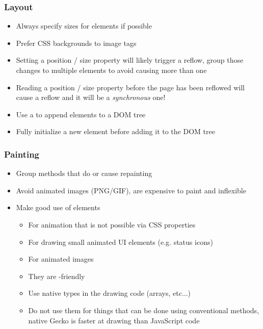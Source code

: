 \begin{frame}
 \frametitle{Layout}
 \begin{itemize}
  \item Always specify sizes for elements if possible
  \item Prefer CSS backgrounds to image tags
  \item Setting a position / size property will likely trigger a reflow, group
        those changes to multiple elements to avoid causing more than one
  \item Reading a position / size property before the page has been reflowed
        will cause a reflow and it will be a \emph{synchronous} one!
  \item Use a  to append elements to a DOM tree
  \item Fully initialize a new element before adding it to the DOM tree
 \end{itemize}
\end{frame}

\begin{frame}
 \frametitle{Painting}
 \begin{itemize}
  \item Group methods that do or cause repainting
  \item Avoid animated images (PNG/GIF), are expensive to paint and inflexible
  \item Make good use of  elements
  \begin{itemize}
   \item For animation that is not possible via CSS properties
   \item For drawing small animated UI elements (e.g. status icons)
   \item For animated images
   \item They are -friendly
   \item Use native types in the drawing code (arrays, etc...)
   \item Do not use them for things that can be done using conventional methods,
         native Gecko is faster at drawing than JavaScript code
  \end{itemize}
 \end{itemize}
\end{frame}

